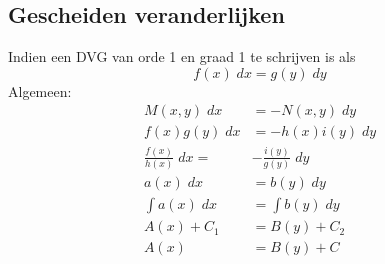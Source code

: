 \subsection{Gescheiden veranderlijken}
Indien een DVG van orde 1 en graad 1 te schrijven is als
$$f(x)\;dx = g(y)\;dy$$
Algemeen:
\begin{equation*}
 \begin{split}
  M(x, y)\;dx & = -N(x, y)\; dy \\
  f(x)g(y)\;dx & = -h(x)i(y)\; dy \\
  \frac{f(x)}{h(x)}\; dx = & -\frac{i(y)}{g(y)}\;dy \\
  a(x) \; dx & = b(y)\; dy \\
  \int a(x) \; dx & = \int b(y) \; dy \\
  A(x) + C_1 & = B(y) + C_2 \\
  A(x) & = B(y) + C
 \end{split}
\end{equation*}
